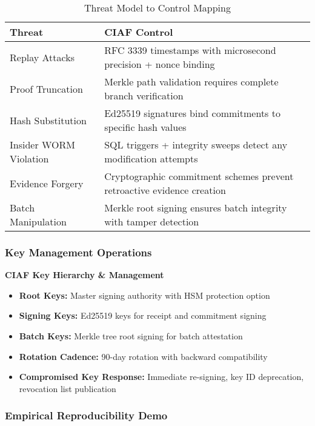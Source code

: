 \documentclass[12pt,a4paper]{article}
\begin{document}
\begin{table}[H]
\centering
\footnotesize
\begin{tabular}{|p{4cm}|p{8cm}|}
\hline
\textbf{Threat} & \textbf{CIAF Control} \\
\hline
Replay Attacks & RFC 3339 timestamps with microsecond precision + nonce binding \\
\hline
Proof Truncation & Merkle path validation requires complete branch verification \\
\hline
Hash Substitution & Ed25519 signatures bind commitments to specific hash values \\
\hline
Insider WORM Violation & SQL triggers + integrity sweeps detect any modification attempts \\
\hline
Evidence Forgery & Cryptographic commitment schemes prevent retroactive evidence creation \\
\hline
Batch Manipulation & Merkle root signing ensures batch integrity with tamper detection \\
\hline
\end{tabular}
\caption{Threat Model to Control Mapping}
\end{table}

\subsubsection{Key Management Operations}

\begin{technicalbox}
\textbf{CIAF Key Hierarchy \& Management}
\begin{itemize}
\item \textbf{Root Keys:} Master signing authority with HSM protection option
\item \textbf{Signing Keys:} Ed25519 keys for receipt and commitment signing
\item \textbf{Batch Keys:} Merkle tree root signing for batch attestation
\item \textbf{Rotation Cadence:} 90-day rotation with backward compatibility
\item \textbf{Compromised Key Response:} Immediate re-signing, key ID deprecation, revocation list publication
\end{itemize}
\end{technicalbox}

\subsubsection{Empirical Reproducibility Demo}
\end{document}
